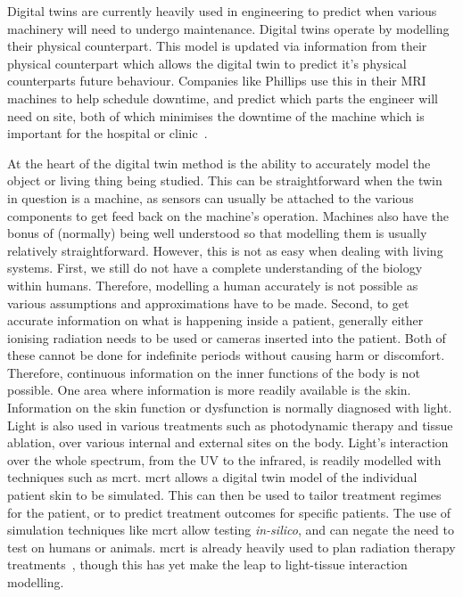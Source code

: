 \noindent Digital twins are currently heavily used in engineering to predict when various machinery will need to undergo maintenance.
Digital twins operate by modelling their physical counterpart.
This model is updated via information from their physical counterpart which allows the digital twin to predict it's physical counterparts future behaviour.
Companies like Phillips use this in their MRI machines to help schedule downtime, and predict which parts the engineer will need on site, both of which minimises the downtime of the machine which is important for the hospital or clinic~\cite{henkvanhouten2018}.

At the heart of the digital twin method is the ability to accurately model the object or living thing being studied.
This can be straightforward when the twin in question is a machine, as sensors can usually be attached to the various components to get feed back on the machine's operation.
Machines also have the bonus of (normally) being well understood so that modelling them is usually relatively straightforward.
However, this is not as easy when dealing with living systems.
First, we still do not have a complete understanding of the biology within humans.
Therefore, modelling a human accurately is not possible as various assumptions and approximations have to be made.
Second, to get accurate information on what is happening inside a patient, generally either ionising radiation needs to be used or cameras inserted into the patient.
Both of these cannot be done for indefinite periods without causing harm or discomfort.
Therefore, continuous information on the inner functions of the body is not possible.
One area where information is more readily available is the skin.
Information on the skin function or dysfunction is normally diagnosed with light.
Light is also used in various treatments such as photodynamic therapy and tissue ablation, over various internal and external sites on the body.
Light's interaction over the whole spectrum, from the UV to the infrared, is readily modelled with techniques such as \gls*{mcrt}.
\Gls*{mcrt} allows a digital twin model of the individual patient skin to be simulated.
This can then be used to tailor treatment regimes for the patient, or to predict treatment outcomes for specific patients.
The use of simulation techniques like \gls*{mcrt} allow testing \textit{in-silico}, and can negate the need to test on humans or animals.
\Gls*{mcrt} is already heavily used to plan radiation therapy treatments~\cite{andreo2018monte,andreo1991monte}, though this has yet make the leap to light-tissue interaction modelling.


